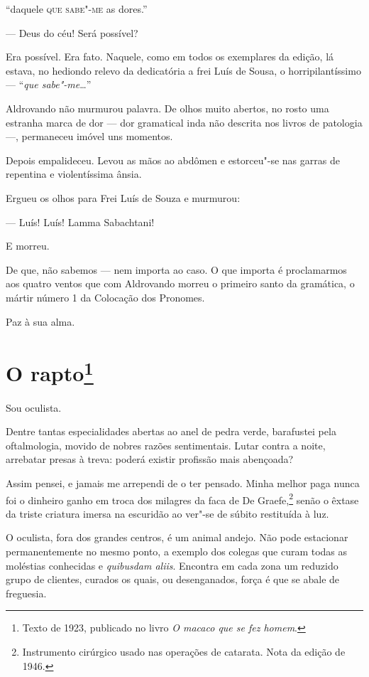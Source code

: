 ``daquele \textsc{que sabe"-me} as dores.''

--- Deus do céu! Será possível?

Era possível. Era fato. Naquele, como em todos os exemplares da edição,
lá estava, no hediondo relevo da dedicatória a frei Luís de Sousa, o
horripilantíssimo --- ``\emph{que sabe"-me}\ldots{}''

Aldrovando não murmurou palavra. De olhos muito abertos, no rosto uma
estranha marca de dor --- dor gramatical inda não descrita nos livros de
patologia ---, permaneceu imóvel uns momentos.

Depois empalideceu. Levou as mãos ao abdômen e estorceu"-se nas garras de
repentina e violentíssima ânsia.

Ergueu os olhos para Frei Luís de Souza e murmurou:

--- Luís! Luís! Lamma Sabachtani!

E morreu.

De que, não sabemos --- nem importa ao caso. O que importa é
proclamarmos aos quatro ventos que com Aldrovando morreu o primeiro
santo da gramática, o mártir número 1 da Colocação dos Pronomes.

Paz à sua alma.

\chapter{O rapto\footnote[*]{Texto de 1923, publicado no livro \emph{O macaco que se fez homem}.}}

Sou oculista.

Dentre tantas especialidades abertas ao anel de pedra verde, barafustei
pela oftalmologia, movido de nobres razões sentimentais. Lutar contra a
noite, arrebatar presas à treva: poderá existir profissão mais
abençoada?

Assim pensei, e jamais me arrependi de o ter pensado. Minha melhor paga
nunca foi o dinheiro ganho em troca dos milagres da faca de De
Graefe,\footnote{Instrumento cirúrgico usado nas operações de catarata.
  Nota da edição de 1946.} senão o êxtase da triste criatura imersa na
escuridão ao ver"-se de súbito restituída à luz.

O oculista, fora dos grandes centros, é um animal andejo. Não pode
estacionar permanentemente no mesmo ponto, a exemplo dos colegas que
curam todas as moléstias conhecidas e \emph{quibusdam aliis}. Encontra
em cada zona um reduzido grupo de clientes, curados os quais, ou
desenganados, força é que se abale de freguesia.

